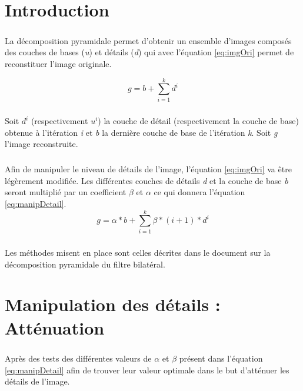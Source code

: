 \documentclass[twoside,UTF8]{EPURapport}
\begin{document}
\chapter{Introduction}

\paragraph{}
La décomposition pyramidale permet d'obtenir un ensemble d'images composés des couches de bases (\textit{u}) et détails (\textit{d}) qui avec l'équation \ref{eq:imgOri} permet de reconstituer l'image originale. 

\begin{equation}
\label{eq:imgOri}
	g = b + \sum^{k}_{i=1}d^{i}
\end{equation}

\paragraph{}
Soit $d^i$ (respectivement $u^i$) la couche de détail (respectivement la couche de base) obtenue à l'itération \textit{i} et \textit{b} la dernière couche de base de l'itération \textit{k}. Soit \textit{g} l'image reconstruite.

\paragraph{}
Afin de manipuler le niveau de détails de l'image, l'équation \ref{eq:imgOri} va être légèrement modifiée. Les différentes couches de détails \textit{d} et la couche de base \textit{b} seront multiplié par un coefficient $\beta$ et $\alpha$ ce qui donnera l'équation \ref{eq:manipDetail}. 
\begin{equation}
\label{eq:manipDetail}
	g = \alpha*b + \sum^{k}_{i=1}\beta*(i+1)*d^{i} 
\end{equation}

\paragraph{}
Les méthodes misent en place sont celles décrites dans le document sur la décomposition pyramidale du filtre bilatéral. 

\chapter{Manipulation des détails : Atténuation}

\paragraph{}
Après des tests des différentes valeurs de $\alpha$ et $\beta$ présent dans l'équation \ref{eq:manipDetail} afin de trouver leur valeur optimale dans le but d'atténuer les détails de l'image. 
\end{document}
